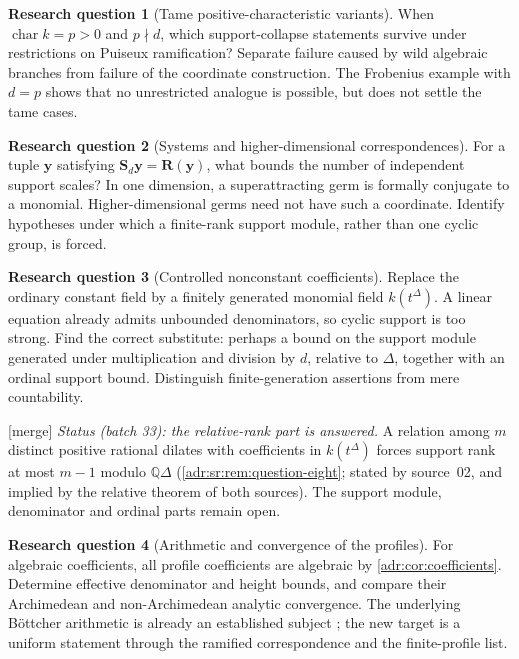 \documentclass[11pt,letterpaper]{article}
\numberwithin{equation}{section}
\theoremstyle{definition}
\newtheorem{question}{Research question}
\theoremstyle{remark}
\newcommand{\Q}{\mathbb Q}
\newcommand{\mtag}{\textup{[merge]}}%
\begin{document}
\begin{question}[Tame positive-characteristic variants]
When $\operatorname{char}k=p>0$ and $p\nmid d$, which support-collapse
statements survive under restrictions on Puiseux ramification? Separate
failure caused by wild algebraic branches from failure of the coordinate
construction. The Frobenius example with $d=p$ shows that no unrestricted
analogue is possible, but does not settle the tame cases.
\end{question}

\begin{question}[Systems and higher-dimensional correspondences]
For a tuple $\mathbf y$ satisfying
$\mathbf S_d\mathbf y=\mathbf R(\mathbf y)$, what bounds the number of
independent support scales? In one dimension, a superattracting germ is
formally conjugate to a monomial. Higher-dimensional germs need not have
such a coordinate. Identify hypotheses under which a finite-rank support
module, rather than one cyclic group, is forced.
\end{question}

\begin{question}[Controlled nonconstant coefficients]
Replace the ordinary constant field by a finitely generated monomial field
$k(t^{\Delta})$. A linear equation already admits unbounded denominators,
so cyclic support is too strong. Find the correct substitute: perhaps a
bound on the support module generated under multiplication and division
by $d$, relative to $\Delta$, together with an ordinal support bound.
Distinguish finite-generation assertions from mere countability.
\end{question}

\mtag{} \emph{Status (batch 33): the relative-rank part is answered.} A
relation among $m$ distinct positive rational dilates with coefficients in
$k(t^\Delta)$ forces support rank at most $m-1$ modulo $\Q\Delta$
(\cref{adr:sr:rem:question-eight}; stated by source~02, and implied by the
relative theorem of both sources). The support module, denominator and ordinal
parts remain open.

\begin{question}[Arithmetic and convergence of the profiles]
For algebraic coefficients, all profile coefficients are algebraic by
\cref{adr:cor:coefficients}. Determine effective denominator and height bounds,
and compare their Archimedean and non-Archimedean analytic convergence.
The underlying B\"ottcher arithmetic is already an established subject
\cite{SS}; the new target is a uniform statement through the ramified
correspondence and the finite-profile list.
\end{question}
\end{document}

